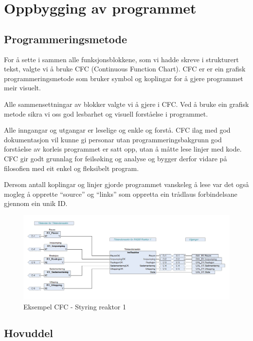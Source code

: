 \newpage
\section{Oppbygging av programmet}
\thispagestyle{fancy}

\subsection{Programmeringsmetode}
For å sette i sammen alle funksjonsblokkene, som vi hadde skreve i strukturert tekst, valgte vi å bruke  \gls{CFC} (Continuous Function Chart).
\gls{CFC} er er ein grafisk programmeringsmetode som bruker symbol og koplingar for å gjere programmet  meir visuelt.

Alle sammensettningar av blokker valgte vi å gjere i \gls{CFC}. Ved å bruke ein grafisk metode sikra vi oss god lesbarhet og
visuell forståelse i programmet. 

Alle inngangar og utgangar er leselige og enkle og forstå. \gls{CFC} ilag med god dokumentasjon vil kunne gi personar utan programmeringsbakgrunn
god forståelse av korleis programmet er satt opp, utan å måtte lese linjer med kode.
\gls{CFC} gir godt grunnlag for feilsøking og analyse og bygger derfor vidare på filosofien med eit enkel og fleksibelt program.

Dersom antall koplingar og linjer gjorde programmet vanskeleg å lese var det også
mogleg å opprette ``source'' og ``links'' som oppretta ein trådlaus forbindelsane gjennom ein unik ID. 

\begin{figure}[htbp]
    \centering
    \includegraphics[width=1\textwidth]{Bilder/ReaktorPRG.png}
    \caption{Eksempel \gls{CFC} - Styring reaktor 1}\label{fig:CFCReaktor}
\end{figure}

\newpage

\subsection{Hovuddel}

